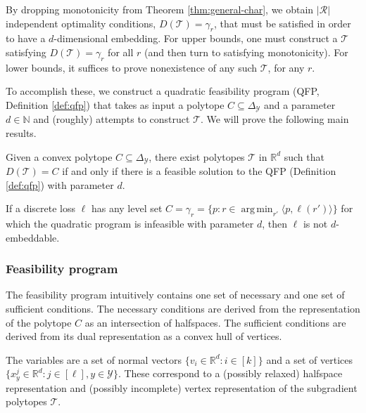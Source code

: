 \documentclass[anon]{colt2020} %
\newcommand{\reals}{\mathbb{R}}
\newcommand{\simplex}{\Delta_\Y}
\newcommand{\R}{\mathcal{R}}
\newcommand{\T}{\mathcal{T}}
\newcommand{\Y}{\mathcal{Y}}
\newcommand{\inprod}[2]{\langle #1, #2 \rangle}%
\DeclareMathOperator*{\argmin}{arg\,min}
\begin{document}
By dropping monotonicity from Theorem \ref{thm:general-char}, we obtain $|\R|$ independent optimality conditions, $D(\T) = \gamma_r$, that must be satisfied in order to have a $d$-dimensional embedding.
For upper bounds, one must construct a $\T$ satisfying $D(\T) = \gamma_r$ for all $r$ (and then turn to satisfying monotonicity).
For lower bounds, it suffices to prove nonexistence of any such $\T$, for any $r$.

To accomplish these, we construct a quadratic feasibility program (QFP, Definition \ref{def:qfp}) that takes as input a polytope $C \subseteq \simplex$ and a parameter $d \in \mathbb{N}$ and (roughly) attempts to construct $\T$.
We will prove the following main results.
\begin{theorem} \label{thm:opt-iff-qfp}
  Given a convex polytope $C \subseteq \simplex$, there exist polytopes $\T$ in $\reals^d$ such that $D(\T) = C$ if and only if there is a feasible solution to the QFP (Definition \ref{def:qfp}) with parameter $d$.
\end{theorem}

\begin{corollary}\label{cor:d-embeddable-char}
  If a discrete loss $\ell$ has any level set $C = \gamma_r = \{p : r \in \argmin_{r'} \inprod{p}{\ell(r')} \}$ for which the quadratic program is infeasible with parameter $d$, then $\ell$ is not $d$-embeddable.
\end{corollary}


\subsubsection{Feasibility program}

The feasibility program intuitively contains one set of necessary and one set of sufficient conditions.
The necessary conditions are derived from the representation of the polytope $C$ as an intersection of halfspaces.
The sufficient conditions are derived from its dual representation as a convex hull of vertices.

The variables are a set of normal vectors $\{v_i \in \reals^d : i \in [k]\}$ and a set of vertices $\{x^j_y \in \reals^d : j \in [\ell], y \in \Y\}$.
These correspond to a (possibly relaxed) halfspace representation and (possibly incomplete) vertex representation of the subgradient polytopes $\T$.
\end{document}
